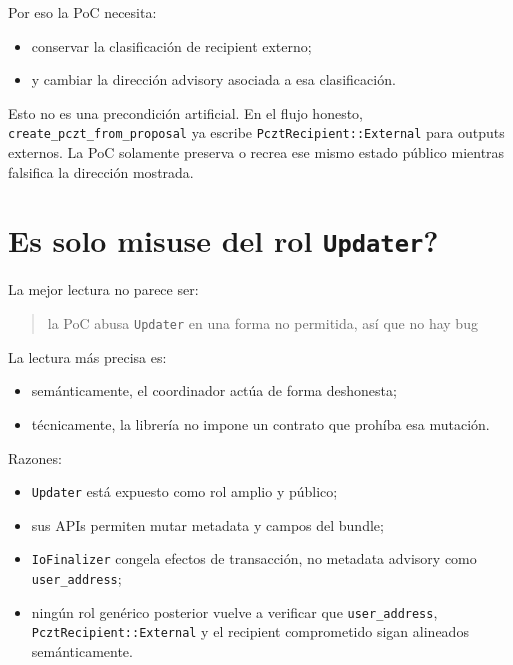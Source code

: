 \documentclass[11pt,a4paper]{article}
\begin{document}
Por eso la PoC necesita:

\begin{itemize}[leftmargin=2em]
    \item conservar la clasificaci\'on de recipient externo;
    \item y cambiar la direcci\'on advisory asociada a esa clasificaci\'on.
\end{itemize}

Esto no es una precondici\'on artificial. En el flujo honesto,
\texttt{create\_pczt\_from\_proposal} ya escribe
\texttt{PcztRecipient::External} para outputs externos. La PoC solamente
preserva o recrea ese mismo estado p\'ublico mientras falsifica la direcci\'on
mostrada.

\section{Es solo misuse del rol \texttt{Updater}?}

La mejor lectura no parece ser:

\begin{quote}
la PoC abusa \texttt{Updater} en una forma no permitida, as\'i que no hay bug
\end{quote}

La lectura m\'as precisa es:

\begin{itemize}[leftmargin=2em]
    \item sem\'anticamente, el coordinador act\'ua de forma deshonesta;
    \item t\'ecnicamente, la librer\'ia no impone un contrato que proh\'iba esa mutaci\'on.
\end{itemize}

Razones:

\begin{itemize}[leftmargin=2em]
    \item \texttt{Updater} est\'a expuesto como rol amplio y p\'ublico;
    \item sus APIs permiten mutar metadata y campos del bundle;
    \item \texttt{IoFinalizer} congela efectos de transacci\'on, no metadata
    advisory como \texttt{user\_address};
    \item ning\'un rol gen\'erico posterior vuelve a verificar que
    \texttt{user\_address}, \texttt{PcztRecipient::External} y el recipient
    comprometido sigan alineados sem\'anticamente.
\end{itemize}
\end{document}
